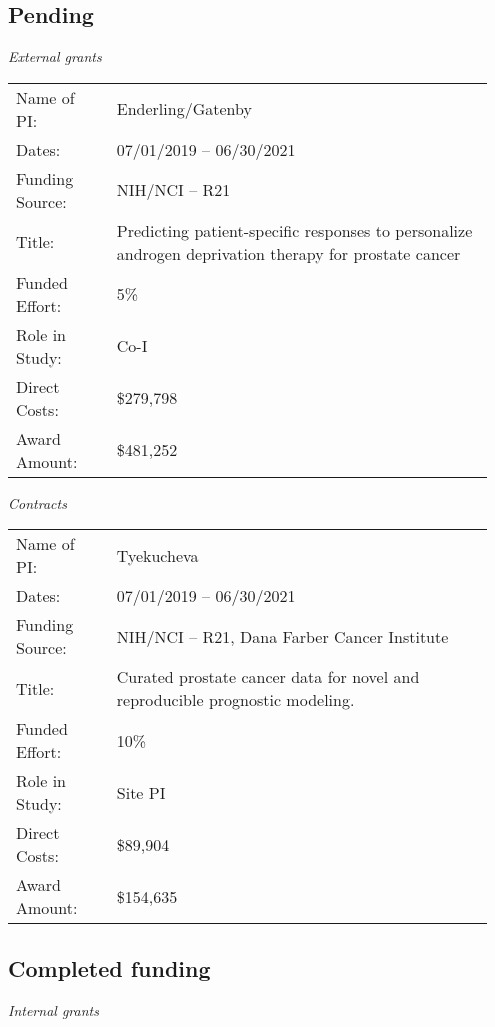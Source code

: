 \documentclass[11pt, a4paper]{article} %
\begin{document}
\subsection*{Pending}
\emph{External grants}
\begin{longtable}{@{}p{0.2\linewidth} p{0.75\linewidth}}
Name of PI: & Enderling/Gatenby\\
Dates: & 07/01/2019 -- 06/30/2021\\
Funding Source: & NIH/NCI -- R21\\
Title: & Predicting patient-specific responses to personalize androgen deprivation therapy for prostate cancer\\
Funded Effort: & 5\%\\
Role in Study: & Co-I \\
Direct Costs: & \$279,798\\
Award Amount: & \$481,252\\
\end{longtable}


\emph{Contracts}
\begin{longtable}{@{}p{0.2\linewidth} p{0.75\linewidth}}
Name of PI: & Tyekucheva\\
Dates: & 07/01/2019 -- 06/30/2021\\
Funding Source: & NIH/NCI -- R21, Dana Farber Cancer Institute\\
Title: & Curated prostate cancer data for novel and reproducible prognostic modeling.\\
Funded Effort: & 10\%\\
Role in Study: & Site PI\\
Direct Costs: & \$89,904\\
Award Amount: & \$154,635\\
\end{longtable}

\subsection*{Completed funding}
\emph{Internal grants}
\end{document}
